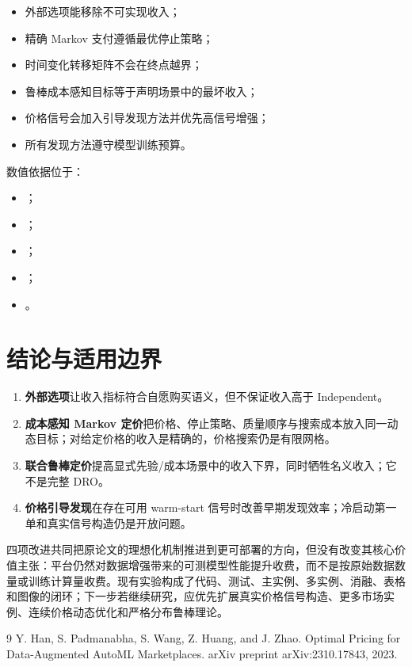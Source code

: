 \documentclass[11pt,a4paper]{ctexart}
\begin{document}
\begin{itemize}
  \item 外部选项能移除不可实现收入；
  \item 精确 Markov 支付遵循最优停止策略；
  \item 时间变化转移矩阵不会在终点越界；
  \item 鲁棒成本感知目标等于声明场景中的最坏收入；
  \item 价格信号会加入引导发现方法并优先高信号增强；
  \item 所有发现方法遵守模型训练预算。
\end{itemize}

数值依据位于：

\begin{itemize}
  \item {}；
  \item {}；
  \item {}；
  \item {}；
  \item {}。
\end{itemize}

\section{结论与适用边界}

\begin{enumerate}
  \item \textbf{外部选项}让收入指标符合自愿购买语义，但不保证收入高于 Independent。
  \item \textbf{成本感知 Markov 定价}把价格、停止策略、质量顺序与搜索成本放入同一动态目标；对给定价格的收入是精确的，价格搜索仍是有限网格。
  \item \textbf{联合鲁棒定价}提高显式先验/成本场景中的收入下界，同时牺牲名义收入；它不是完整 DRO。
  \item \textbf{价格引导发现}在存在可用 warm-start 信号时改善早期发现效率；冷启动第一单和真实信号构造仍是开放问题。
\end{enumerate}

四项改进共同把原论文的理想化机制推进到更可部署的方向，但没有改变其核心价值主张：平台仍然对数据增强带来的可测模型性能提升收费，而不是按原始数据数量或训练计算量收费。现有实验构成了代码、测试、主实例、多实例、消融、表格和图像的闭环；下一步若继续研究，应优先扩展真实价格信号构造、更多市场实例、连续价格动态优化和严格分布鲁棒理论。

\begin{thebibliography}{9}
Y. Han, S. Padmanabha, S. Wang, Z. Huang, and J. Zhao.
\newblock Optimal Pricing for Data-Augmented AutoML Marketplaces.
\newblock arXiv preprint arXiv:2310.17843, 2023.
\end{thebibliography}
\end{document}
